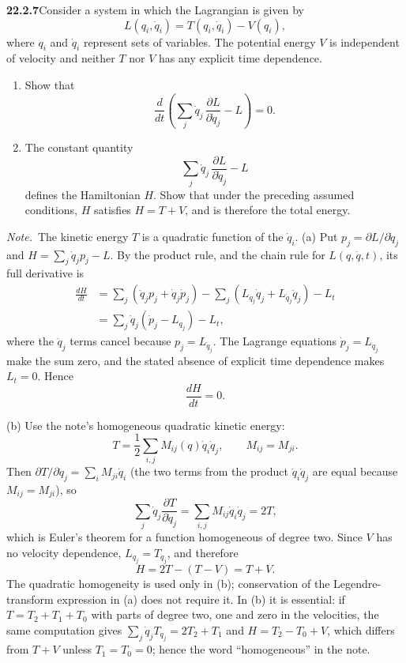 \par\bigskip
\noindent\textbf{22.2.7}\quad Consider a system in which the
Lagrangian is given by
\[
L(q_{i},\dot{q}_{i})=T(q_{i},\dot{q}_{i})-V(q_{i}),
\]
where $q_{i}$ and $\dot{q}_{i}$ represent sets of variables. The
potential energy $V$ is independent of velocity and neither $T$
nor $V$ has any explicit time dependence.
\begin{enumerate}
\item[(a)] Show that
\[
\frac{d}{dt}\left(\sum_{j}\dot{q}_{j}\,
\frac{\partial L}{\partial\dot{q}_{j}}-L\right)=0.
\]
\item[(b)] The constant quantity
\[
\sum_{j}\dot{q}_{j}\,\frac{\partial L}{\partial\dot{q}_{j}}-L
\]
defines the Hamiltonian $H$. Show that under the preceding
assumed conditions, $H$ satisfies $H=T+V$, and is therefore the
total energy.
\end{enumerate}
\par\emph{Note.}~The kinetic energy $T$ is a  quadratic function
of the $\dot{q}_{i}$.
\solution
(a) Put $p_j=\partial L/\partial\dot q_j$ and
$H=\sum_j\dot q_jp_j-L$. By the product rule, and the chain rule for
$L(q,\dot q,t)$, its full derivative is
\[
\begin{aligned}
\frac{dH}{dt}
&=\sum_j(\ddot q_jp_j+\dot q_j\dot p_j)
-\sum_j\left(L_{q_j}\dot q_j+L_{\dot q_j}\ddot q_j\right)
-L_t\\
&=\sum_j\dot q_j(\dot p_j-L_{q_j})-L_t,
\end{aligned}
\]
where the $\ddot q_j$ terms cancel because $p_j=L_{\dot q_j}$.
The Lagrange equations $\dot p_j=L_{q_j}$ make the sum zero, and the
stated absence of explicit time dependence makes $L_t=0$. Hence
\[
\boxed{\frac{dH}{dt}=0}.
\]

(b) Use the note's homogeneous quadratic kinetic energy:
\[
T=\frac12\sum_{i,j}M_{ij}(q)\dot q_i\dot q_j,
\qquad M_{ij}=M_{ji}.
\]
Then $\partial T/\partial\dot q_j=\sum_iM_{ji}\dot q_i$ (the two
terms from the product $\dot q_i\dot q_j$ are equal because
$M_{ij}=M_{ji}$), so
\[
\sum_j\dot q_j\frac{\partial T}{\partial\dot q_j}
=\sum_{i,j}M_{ij}\dot q_i\dot q_j=2T,
\]
which is Euler's theorem for a function homogeneous of degree two.
Since $V$ has no velocity dependence, $L_{\dot q_j}=T_{\dot q_j}$,
and therefore
\[
\boxed{H=2T-(T-V)=T+V}.
\]
The quadratic homogeneity is used only in (b); conservation
of the Legendre-transform expression in (a) does not require it.
In (b) it is essential: if $T=T_2+T_1+T_0$ with parts of degree two,
one and zero in the velocities, the same computation gives
$\sum_j\dot q_jT_{\dot q_j}=2T_2+T_1$ and
$H=T_2-T_0+V$, which differs from $T+V$ unless $T_1=T_0=0$; hence the
word ``homogeneous'' in the note.


